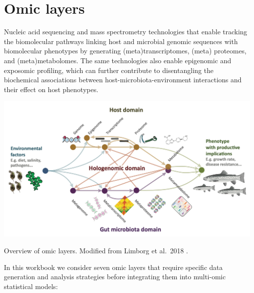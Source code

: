 \documentclass[
]{book}
\begin{document}
\hypertarget{omic-layers}{%
\section{Omic layers}\label{omic-layers}}

Nucleic acid sequencing and mass spectrometry technologies that enable tracking the biomolecular pathways linking host and microbial genomic sequences with biomolecular phenotypes by generating (meta)transcriptomes, (meta) proteomes, and (meta)metabolomes. The same technologies also enable epigenomic and exposomic profiling, which can further contribute to disentangling the biochemical associations between host-microbiota-environment interactions and their effect on host phenotypes.

\includegraphics{images/omic_layers_limborg.png}

Overview of omic layers. Modified from Limborg et al.~2018 \citep{Limborg2018-tf}.

In this workbook we consider seven omic layers that require specific data generation and analysis strategies before integrating them into multi-omic statistical models:
\end{document}

